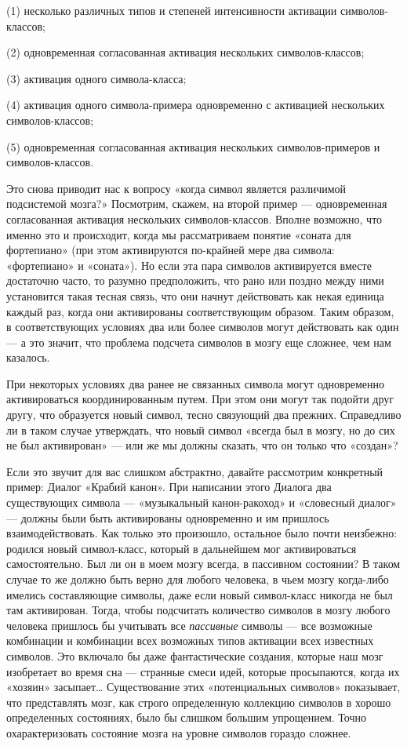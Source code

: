 \documentclass[../main.tex]{subfiles}
\begin{document}
(1) несколько различных типов и степеней интенсивности активации символов-классов;

(2) одновременная согласованная активация нескольких символов-классов;

(3) активация одного символа-класса;

(4) активация одного символа-примера одновременно с активацией нескольких символов-классов;

(5) одновременная согласованная активация нескольких символов-примеров и символов-классов.

Это снова приводит нас к вопросу «когда символ является различимой подсистемой мозга?» Посмотрим, скажем, на второй пример --- одновременная согласованная активация нескольких символов-классов. Вполне возможно, что именно это и происходит, когда мы рассматриваем понятие «соната для фортепиано» (при этом активируются по-крайней мере два символа: «фортепиано» и «соната»). Но если эта пара символов активируется вместе достаточно часто, то разумно предположить, что рано или поздно между ними установится такая тесная связь, что они начнут действовать как некая единица каждый раз, когда они активированы соответствующим образом. Таким образом, в соответствующих условиях два или более символов могут действовать как один --- а это значит, что проблема подсчета символов в мозгу еще сложнее, чем нам казалось.

При некоторых условиях два ранее не связанных символа могут одновременно активироваться координированным путем. При этом они могут так подойти друг другу, что образуется новый символ, тесно связующий два прежних. Справедливо ли в таком случае утверждать, что новый символ «всегда был в мозгу, но до сих не был активирован» --- или же мы должны сказать, что он только что «создан»?

Если это звучит для вас слишком абстрактно, давайте рассмотрим конкретный пример: Диалог «Крабий канон». При написании этого Диалога два существующих символа --- «музыкальный канон-ракоход» и «словесный диалог» --- должны были быть активированы одновременно и им пришлось взаимодействовать. Как только это произошло, остальное было почти неизбежно: родился новый символ-класс, который в дальнейшем мог активироваться самостоятельно. Был ли он в моем мозгу всегда, в пассивном состоянии? В таком случае то же должно быть верно для любого человека, в чьем мозгу когда-либо имелись составляющие символы, даже если новый символ-класс никогда не был там активирован. Тогда, чтобы подсчитать количество символов в мозгу любого человека пришлось бы учитывать все \emph{пассивные} символы --- все возможные комбинации и комбинации всех возможных типов активации всех известных символов. Это включало бы даже фантастические создания, которые наш мозг изобретает во время сна --- странные смеси идей, которые просыпаются, когда их «хозяин» засыпает\ldots{} Существование этих «потенциальных символов» показывает, что представлять мозг, как строго определенную коллекцию символов в хорошо определенных состояниях, было бы слишком большим упрощением. Точно охарактеризовать состояние мозга на уровне символов гораздо сложнее.
\end{document}
